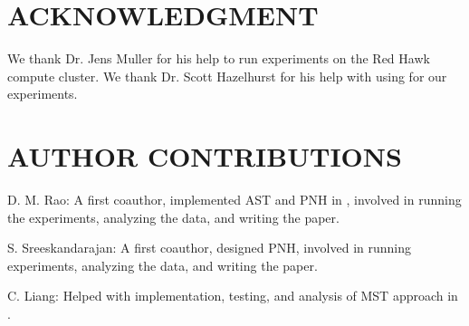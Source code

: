 
\section*{ACKNOWLEDGMENT}

We thank Dr. Jens Muller for his help to run experiments on the Red
Hawk compute cluster.  We thank Dr. Scott Hazelhurst for his help with
using  for our experiments.

\section*{AUTHOR CONTRIBUTIONS}


D. M. Rao: A first coauthor, implemented AST and PNH in \peace,
involved in running the experiments, analyzing the data, and writing
the paper.

S. Sreeskandarajan: A first coauthor, designed PNH, involved in
running experiments, analyzing the data, and writing the paper.

C. Liang: Helped with implementation, testing, and analysis of MST
approach in \peace.

